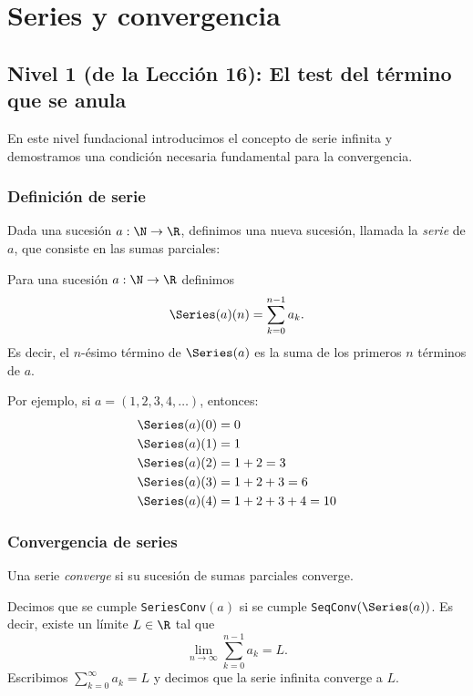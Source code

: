 \chapter{Series y convergencia}

\section{Nivel 1 (de la Lección 16): El test del término que se anula}

En este nivel fundacional introducimos el concepto de serie infinita y demostramos una condición necesaria fundamental para la convergencia.

\subsection{Definición de serie}

Dada una sucesión $a : \N \to \R$, definimos una nueva sucesión, llamada la \emph{serie} de $a$, que consiste en las sumas parciales:

\begin{definicion}[Serie]
Para una sucesión $a : \N \to \R$ definimos
\[
  \Series(a)(n) = \sum_{k=0}^{n-1} a_k .
\]
Es decir, el $n$-ésimo término de $\Series(a)$ es la suma de los primeros $n$ términos de $a$.
\end{definicion}

Por ejemplo, si $a = (1,2,3,4,\dots)$, entonces:
\begin{align*}
  \Series(a)(0) &= 0\\
  \Series(a)(1) &= 1\\
  \Series(a)(2) &= 1+2 = 3\\
  \Series(a)(3) &= 1+2+3 = 6\\
  \Series(a)(4) &= 1+2+3+4 = 10
\end{align*}

\subsection{Convergencia de series}

Una serie \emph{converge} si su sucesión de sumas parciales converge.

\begin{definicion}[SeriesConv]
Decimos que se cumple \texttt{SeriesConv}$(a)$ si se cumple \texttt{SeqConv}$(\Series(a))$. Es decir, existe un límite $L \in \R$ tal que
\[
  \lim_{n\to\infty} \sum_{k=0}^{n-1} a_k = L .
\]
Escribimos $\sum_{k=0}^{\infty} a_k = L$ y decimos que la serie infinita converge a $L$.
\end{definicion}

